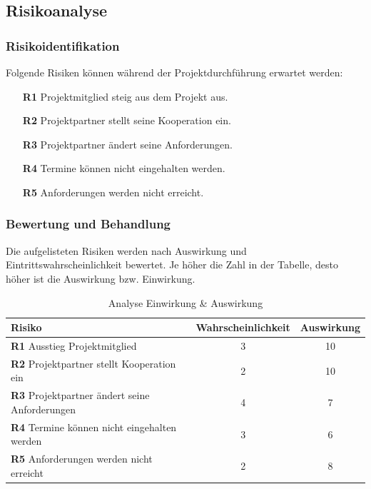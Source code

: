 \subsection{Risikoanalyse}
\subsubsection{Risikoidentifikation}
Folgende Risiken können während der Projektdurchführung erwartet werden:
\begin{itemize}
	\item[\textbf{R1}] Projektmitglied steig aus dem Projekt aus.
	\item[\textbf{R2}] Projektpartner stellt seine Kooperation ein.
	\item[\textbf{R3}] Projektpartner ändert seine Anforderungen.
	\item[\textbf{R4}] Termine können nicht eingehalten werden.
	\item[\textbf{R5}] Anforderungen werden nicht erreicht.			
\end{itemize}

\subsubsection{Bewertung und Behandlung}
Die aufgelisteten Risiken werden nach Auswirkung und Eintrittswahrscheinlichkeit bewertet.
Je höher die Zahl in der Tabelle, desto höher ist die Auswirkung bzw. Einwirkung.
\begin{table}[h]
	\begin{tabular}{l|c|c}
		\textbf{Risiko}                           & \multicolumn{1}{l|}{\textbf{Wahrscheinlichkeit}} & \multicolumn{1}{l}{\textbf{Auswirkung}} \\ \hline
		\textbf{R1} Ausstieg Projektmitglied                  & 3                                                & 10                                      \\
		\textbf{R2} Projektpartner stellt Kooperation ein     & 2                                                & 10                                      \\
		\textbf{R3} Projektpartner ändert seine Anforderungen & 4                                                & 7                                       \\
		\textbf{R4} Termine können nicht eingehalten werden   & 3                                                & 6                                       \\
		\textbf{R5} Anforderungen werden nicht erreicht       & 2                                                & 8                                      
	\end{tabular}
	\caption{Analyse Einwirkung \& Auswirkung}
	\label{Abb_Einwirkung_Auswirkung}
\end{table}
\newpage

